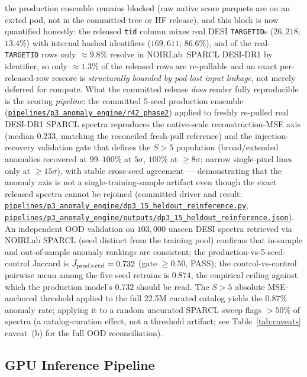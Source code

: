 \documentclass[aps,prd,twocolumn,superscriptaddress,showpacs,preprintnumbers,nofootinbib,longbibliography,floatfix]{revtex4-2}
\newcommand{\repoBase}{https://github.com/Hubify-Projects/bigbounce/blob/main}
\newcommand{\artifact}[1]{\href{\repoBase/#1}{\nolinkurl{#1}}}
\begin{document}
the production ensemble remains blocked (raw native score parquets are on an exited pod, not in the committed tree or HF release), and this block is now quantified honestly: the released \texttt{tid} column mixes real DESI \texttt{TARGETID}s ($26{,}218$; $13.4\%$) with internal hashed identifiers ($169{,}611$; $86.6\%$), and of the real-\texttt{TARGETID} rows only ${\approx}9.8\%$ resolve in NOIRLab~SPARCL DESI-DR1 by identifier, so only ${\approx}1.3\%$ of the released rows are re-pullable and an exact per-released-row rescore is \emph{structurally bounded by pod-lost input linkage}, not merely deferred for compute. What the committed release \emph{does} render fully reproducible is the scoring \emph{pipeline}: the committed $5$-seed production ensemble (\artifact{pipelines/p3\_anomaly\_engine/r42\_phase2}) applied to freshly re-pulled real DESI-DR1 SPARCL spectra reproduces the native-scale reconstruction-MSE axis (median $0.233$, matching the reconciled fresh-pull reference) and the injection-recovery validation gate that defines the $S>5$ population (broad/extended anomalies recovered at $99$--$100\%$ at $5\sigma$, $100\%$ at $\geq\!8\sigma$; narrow single-pixel lines only at $\geq\!15\sigma$), with stable cross-seed agreement --- demonstrating that the anomaly axis is not a single-training-sample artifact even though the exact released spectra cannot be rejoined (committed driver and result: \artifact{pipelines/p3\_anomaly\_engine/dp3\_15\_heldout\_reinference.py}, \artifact{pipelines/p3\_anomaly\_engine/outputs/dp3\_15\_heldout\_reinference.json}). An independent OOD validation on $103{,}000$ unseen DESI spectra retrieved via NOIRLab SPARCL (seed distinct from the training pool) confirms that in-sample and out-of-sample anomaly rankings are consistent; the production-vs-5-seed-control Jaccard is $\bar{J}_{\rm prod\times ctrl} = 0.732$ (gate $\geq 0.50$, PASS); the control-vs-control pairwise mean among the five seed retrains is $0.874$, the empirical ceiling against which the production model's $0.732$ should be read. The $S>5$ absolute MSE-anchored threshold applied to the full 22.5M curated catalog yields the $0.87\%$ anomaly rate; applying it to a random uncurated SPARCL sweep flags $>50\%$ of spectra (a catalog-curation effect, not a threshold artifact; see Table~\ref{tab:caveats} caveat~(b) for the full OOD reconciliation).

\subsection{GPU Inference Pipeline}\label{sec:inference}
\end{document}
